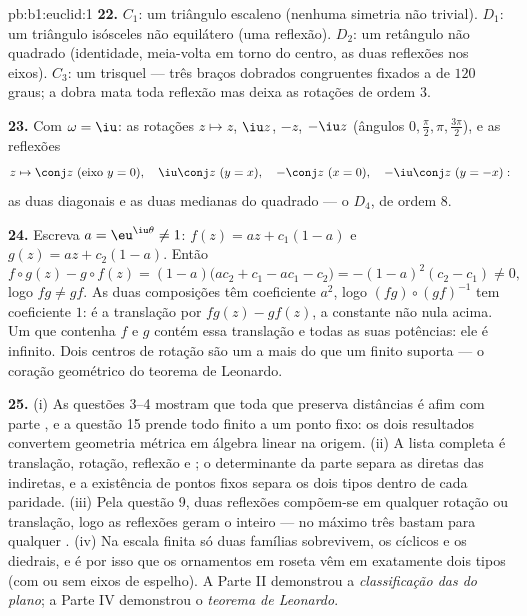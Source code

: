 \begin{solution}{pb:b1:euclid:1}
\textbf{22.} $C_1$: um triângulo escaleno (nenhuma simetria não
trivial). $D_1$: um triângulo isósceles não equilátero (uma
reflexão). $D_2$: um retângulo não quadrado (identidade, meia-volta
em torno do centro, as duas reflexões nos eixos). $C_3$: um trisquel
--- três braços dobrados congruentes fixados a  de $120$
graus; a dobra mata toda reflexão mas deixa as rotações de ordem
$3$.

\textbf{23.} Com $\omega = \iu$: as rotações $z \mapsto z$, $\iu z$, $-z$, $-\iu z$
(ângulos $0, \frac\pi2, \pi,
\frac{3\pi}2$), e as reflexões
\[
z \mapsto \conj z \ (\text{eixo } y = 0), \quad
\iu\conj z \ (y = x), \quad
-\conj z \ (x = 0), \quad
-\iu\conj z \ (y = -x):
\]
as duas diagonais e as duas medianas do quadrado --- o  $D_4$, de ordem $8$.

\textbf{24.} Escreva $a = \eu^{\iu\theta} \neq 1$: $f(z) = az +
c_1(1 - a)$ e $g(z) = az + c_2(1 - a)$. Então
\[
f\circ g(z) - g\circ f(z)
= (1-a)\bigl(ac_2 + c_1 - ac_1 - c_2\bigr)
= -(1 - a)^2(c_2 - c_1) \neq 0 ,
\]
logo $f g \neq g f$. As duas composições têm coeficiente  $a^2$, logo
$(fg)\circ(gf)^{-1}$ tem coeficiente  $1$: é a translação por $fg(z) - gf(z)$, a
constante não nula acima. Um  que contenha $f$ e $g$ contém
essa translação e todas as suas potências: ele é infinito. Dois
centros de rotação são um a mais do que um  finito suporta ---
o coração geométrico do teorema de Leonardo.

\textbf{25.} (i) As questões 3--4 mostram que toda  que
preserva distâncias é afim com parte  , e a questão
15 prende todo  finito a um ponto fixo: os dois resultados
convertem geometria métrica em álgebra linear na origem. (ii) A
lista completa é translação, rotação, reflexão e ; o determinante da parte  separa as diretas das
indiretas, e a existência de pontos fixos separa os dois tipos
dentro de cada paridade. (iii) Pela questão 9, duas reflexões
compõem-se em qualquer rotação ou translação, logo as reflexões
geram o  inteiro --- no máximo três bastam para qualquer
. (iv) Na escala finita só duas famílias sobrevivem, os
 cíclicos e os diedrais, e é por isso que os ornamentos em
roseta vêm em exatamente dois tipos (com ou sem eixos de espelho).
A Parte II demonstrou a \emph{classificação das  do
plano}; a Parte IV demonstrou o \emph{teorema de Leonardo}.
\end{solution}
